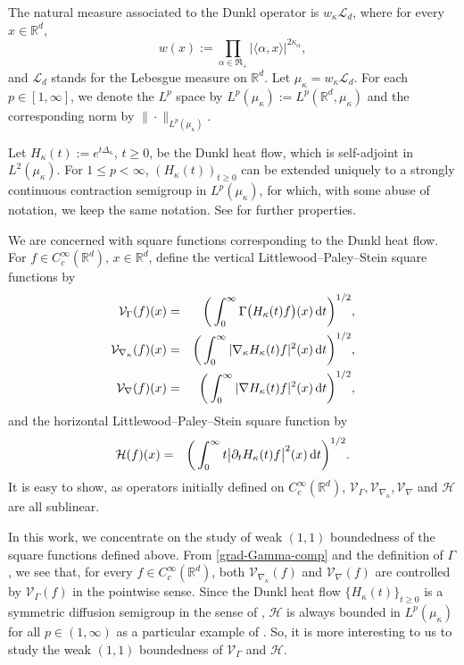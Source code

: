 \documentclass[11pt,a4paper]{article}
\def\R{\mathbb{R}}
\def\L{\mathcal{L}}
\def\d{\textup{d}}
\theoremstyle{definition}\newtheorem{remark}[theorem]{Remark}
\begin{document}
The natural measure associated to the Dunkl operator is  $w_\kappa\L_d$, where for every $x\in\R^d$,
$$w(x):=\prod_{\alpha\in\mathfrak{R}_+}|\langle\alpha,x\rangle|^{2\kappa_\alpha},$$
and $\L_d$ stands for the Lebesgue measure on $\R^d$. Let $\mu_\kappa=w_\kappa\L_d$. For each $p\in[1,\infty]$, we denote the $L^p$ space by $L^p(\mu_\kappa):=L^p(\R^d,\mu_\kappa)$ and the corresponding norm by $\|\cdot\|_{L^p(\mu_\kappa)}$.


Let $H_\kappa(t):=e^{t\Delta_\kappa}$, $t\geq0$, be the Dunkl heat flow, which is self-adjoint in $L^2(\mu_\kappa)$. For $1\leq p<\infty$, $(H_\kappa(t))_{t\geq0}$ can be extended uniquely to a strongly continuous contraction semigroup in $L^p(\mu_\kappa)$, for which, with some abuse of notation, we keep the same notation. See \cite{Rosler1998,RosVoi1998,Rosler2003} for further properties.


We are concerned with square functions corresponding to the Dunkl heat flow. For $f\in C_c^\infty(\R^d)$, $x\in\R^d$, define the vertical Littlewood--Paley--Stein square functions by
\begin{eqnarray*}
\mathcal{V}_\Gamma(f)(x)&=&\bigg(\int_0^\infty \Gamma\big(H_\kappa(t)f\big)(x)\,\d t\bigg)^{1/2},\\
\mathcal{V}_{\nabla_\kappa}(f)(x)&=&\bigg(\int_0^\infty |\nabla_\kappa H_\kappa(t)f|^2(x)\,\d t\bigg)^{1/2},\\
\mathcal{V}_{\nabla}(f)(x)&=&\bigg(\int_0^\infty |\nabla H_\kappa(t)f|^2(x)\,\d t\bigg)^{1/2},
\end{eqnarray*}
and the horizontal Littlewood--Paley--Stein square function by
\begin{eqnarray*}
\mathcal{H}(f)(x)&=&\bigg(\int_0^\infty t\big|\partial_t H_\kappa(t)f\big|^2(x)\,\d t\bigg)^{1/2}.
\end{eqnarray*}
It is easy to show, as operators initially defined on $C_c^\infty(\R^d)$, $\mathcal{V}_{\Gamma},\mathcal{V}_{\nabla_\kappa},\mathcal{V}_{\nabla}$ and $\mathcal{H}$ are all sublinear.

In this work, we concentrate on the study of weak $(1,1)$ boundedness of the square functions defined above. From \eqref{grad-Gamma-comp} and the definition of $\Gamma$, we see that, for every $f\in C^\infty_c(\R^d)$, both $\mathcal{V}_{\nabla_\kappa}(f)$ and $\mathcal{V}_{\nabla}(f)$ are controlled by $\mathcal{V}_\Gamma(f)$ in the pointwise sense. Since the Dunkl heat flow $\{H_\kappa(t)\}_{t\geq0}$  is a symmetric diffusion semigroup in the sense of \cite[Page 65]{Stein70}, $\mathcal{H}$ is always bounded in $L^p(\mu_\kappa)$ for all $p\in (1,\infty)$ as a particular example of \cite[Corollary 1, page 120]{Stein70}. So, it is more interesting to us to study the weak $(1,1)$ boundedness of $\mathcal{V}_\Gamma$ and $\mathcal{H}$.
\end{document}
